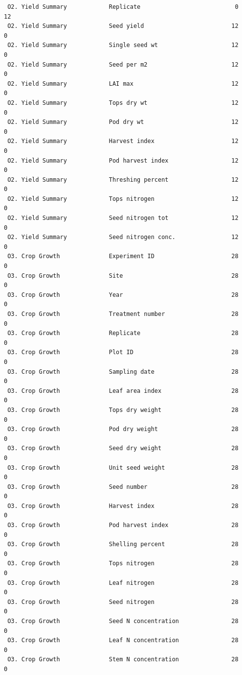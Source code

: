 \documentclass[
]{article}
\begin{document}
\begin{verbatim}
 O2. Yield Summary            Replicate                           0      12
 O2. Yield Summary            Seed yield                         12       0
 O2. Yield Summary            Single seed wt                     12       0
 O2. Yield Summary            Seed per m2                        12       0
 O2. Yield Summary            LAI max                            12       0
 O2. Yield Summary            Tops dry wt                        12       0
 O2. Yield Summary            Pod dry wt                         12       0
 O2. Yield Summary            Harvest index                      12       0
 O2. Yield Summary            Pod harvest index                  12       0
 O2. Yield Summary            Threshing percent                  12       0
 O2. Yield Summary            Tops nitrogen                      12       0
 O2. Yield Summary            Seed nitrogen tot                  12       0
 O2. Yield Summary            Seed nitrogen conc.                12       0
 O3. Crop Growth              Experiment ID                      28       0
 O3. Crop Growth              Site                               28       0
 O3. Crop Growth              Year                               28       0
 O3. Crop Growth              Treatment number                   28       0
 O3. Crop Growth              Replicate                          28       0
 O3. Crop Growth              Plot ID                            28       0
 O3. Crop Growth              Sampling date                      28       0
 O3. Crop Growth              Leaf area index                    28       0
 O3. Crop Growth              Tops dry weight                    28       0
 O3. Crop Growth              Pod dry weight                     28       0
 O3. Crop Growth              Seed dry weight                    28       0
 O3. Crop Growth              Unit seed weight                   28       0
 O3. Crop Growth              Seed number                        28       0
 O3. Crop Growth              Harvest index                      28       0
 O3. Crop Growth              Pod harvest index                  28       0
 O3. Crop Growth              Shelling percent                   28       0
 O3. Crop Growth              Tops nitrogen                      28       0
 O3. Crop Growth              Leaf nitrogen                      28       0
 O3. Crop Growth              Seed nitrogen                      28       0
 O3. Crop Growth              Seed N concentration               28       0
 O3. Crop Growth              Leaf N concentration               28       0
 O3. Crop Growth              Stem N concentration               28       0

\end{verbatim}
\end{document}
